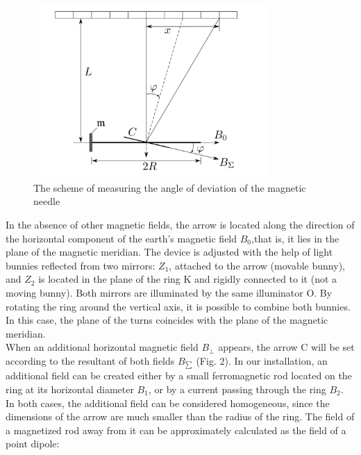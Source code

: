 \documentclass[a4paper, 12pt]{article}%
\begin{document}
\begin{figure}[h]
\begin{center}
\includegraphics[width = 0.8\textwidth]{Fig2.png}
\caption{The scheme of measuring the angle of deviation of the magnetic needle}
\end{center}
\end{figure}
In the absence of other magnetic fields, the arrow is located along the
direction of the horizontal component of the earth's magnetic field \textbf{$B_0$},that is, it lies in the plane of the magnetic meridian. The device is adjusted with the help of light bunnies reflected from two mirrors: $Z_1$, attached to the arrow (movable bunny), and $Z_2$ is located in the plane of the ring K and rigidly connected to it (not a moving bunny). Both mirrors are illuminated by the same illuminator O. By rotating the ring around the vertical axis, it is possible to combine both bunnies. In this case, the plane of the turns coincides with the plane of the magnetic meridian.\\
\newline
When an additional horizontal magnetic field \textbf{$B_{\perp}$} appears, the arrow C will be set according to the resultant of both fields \textbf{$B_{\sum}$} (Fig. 2). In our installation, an additional field can be created either by a small ferromagnetic rod located on the ring at its horizontal diameter \textbf{$B_1$}, or by a current passing through the ring \textbf{$B_2$}. In both cases, the additional field can be considered homogeneous, since the dimensions of the arrow are much smaller than the radius of the ring. The field of a magnetized rod away from it can be approximately calculated as the field of a point dipole:
\end{document}
